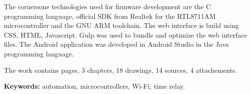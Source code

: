 The cornersone technologies used for firmware development are the C programming language, official SDK from Realtek for the RTL8711AM microcontroller and the GNU ARM toolchain. The web interface is build using CSS, HTML, Javascript. Gulp was used to bundle and optimize the web interface files. The Android application was developed in Android Studio in the Java programming language. 

The work contains \pageref{LastPage} pages, 3 chapters, 18 drawings, 14 sources, 4 attachements.

\textbf{Keywords:} automation, microcontrollers, Wi-Fi, time relay.

